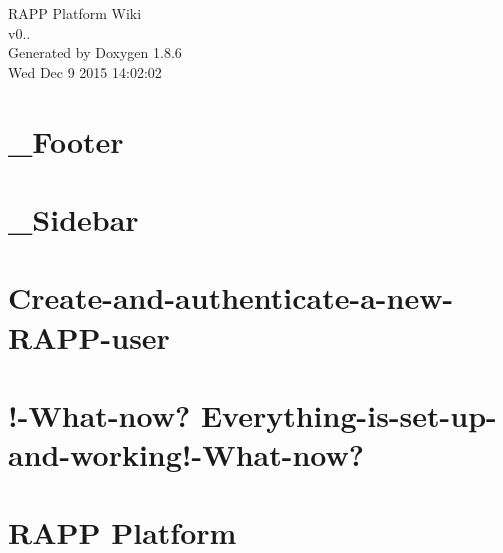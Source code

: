 \documentclass[twoside]{book}
\newcommand{\clearemptydoublepage}{%
  \newpage{\pagestyle{empty}\cleardoublepage}%
}
\begin{document}
\hypersetup{pageanchor=false}
\begin{titlepage}
\vspace*{7cm}
\begin{center}%
{\Large R\-A\-P\-P Platform Wiki \\[1ex]\large v0.. }\\
\vspace*{1cm}
{\large Generated by Doxygen 1.8.6}\\
\vspace*{0.5cm}
{\small Wed Dec 9 2015 14:02:02}\\
\end{center}
\end{titlepage}
\clearemptydoublepage
\tableofcontents
\clearemptydoublepage
{}
\hypersetup{pageanchor=true}

\chapter{\-\_\-\-Footer}
\label{md_rapp-platform_8wiki__Footer}
\hypertarget{md_rapp-platform_8wiki__Footer}{}

\chapter{\-\_\-\-Sidebar}
\label{md_rapp-platform_8wiki__Sidebar}
\hypertarget{md_rapp-platform_8wiki__Sidebar}{}

\chapter{Create-\/and-\/authenticate-\/a-\/new-\/\-R\-A\-P\-P-\/user}
\label{md_rapp-platform_8wiki_Create-and-authenticate-a-new-RAPP-user}
\hypertarget{md_rapp-platform_8wiki_Create-and-authenticate-a-new-RAPP-user}{}

\chapter{!-\/\-What-\/now? Everything-\/is-\/set-\/up-\/and-\/working!-\/\-What-\/now?}
\label{md_rapp-platform_8wiki_Everything-is-set-up-and-working}
\hypertarget{md_rapp-platform_8wiki_Everything-is-set-up-and-working}{}

\chapter{R\-A\-P\-P Platform}
\label{md_rapp-platform_8wiki_Home}
\hypertarget{md_rapp-platform_8wiki_Home}{}

\end{document}
